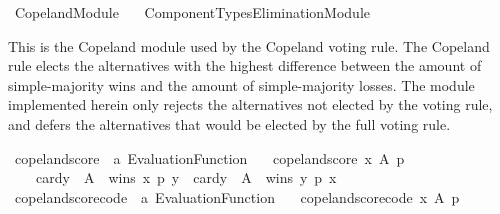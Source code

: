 %
\begin{isabellebody}%
%
%
\isadelimdocument
\isanewline
%
\endisadelimdocument
%
\isatagdocument
\isanewline
%
\isamarkuptrue%
%
\endisatagdocument
{\isafolddocument}%
%
\isadelimdocument
%
\endisadelimdocument
%
\isadelimtheory
%
\endisadelimtheory
%
\isatagtheory
{}\isamarkupfalse%
\ Copeland{\isacharunderscore}{\kern0pt}Module\isanewline
\ \ \ {\isachardoublequoteopen}Component{\isacharunderscore}{\kern0pt}Types{\isacharslash}{\kern0pt}Elimination{\isacharunderscore}{\kern0pt}Module{\isachardoublequoteclose}\isanewline
{}%
\endisatagtheory
{\isafoldtheory}%
%
\isadelimtheory
%
\endisadelimtheory
%
\begin{isamarkuptext}%
This is the Copeland module used by the Copeland voting rule. The Copeland
rule elects the alternatives with the highest difference between the amount
of simple-majority wins and the amount of simple-majority losses. The module
implemented herein only rejects the alternatives not elected by the voting
rule, and defers the alternatives that would be elected by the full voting
rule.%
\end{isamarkuptext}\isamarkuptrue%
%
\isadelimdocument
%
\endisadelimdocument
%
\isatagdocument
%
\isamarkuptrue%
%
\endisatagdocument
{\isafolddocument}%
%
\isadelimdocument
%
\endisadelimdocument
{}\isamarkupfalse%
\ copeland{\isacharunderscore}{\kern0pt}score\ {\isacharcolon}{\kern0pt}{\isacharcolon}{\kern0pt}\ {\isachardoublequoteopen}{\isacharprime}{\kern0pt}a\ Evaluation{\isacharunderscore}{\kern0pt}Function{\isachardoublequoteclose}\ \isanewline
\ \ {\isachardoublequoteopen}copeland{\isacharunderscore}{\kern0pt}score\ x\ A\ p\ {\isacharequal}{\kern0pt}\isanewline
\ \ \ \ card{\isacharbraceleft}{\kern0pt}y\ {\isasymin}\ A\ {\isachardot}{\kern0pt}\ wins\ x\ p\ y{\isacharbraceright}{\kern0pt}\ {\isacharminus}{\kern0pt}\ card{\isacharbraceleft}{\kern0pt}y\ {\isasymin}\ A\ {\isachardot}{\kern0pt}\ wins\ y\ p\ x{\isacharbraceright}{\kern0pt}{\isachardoublequoteclose}\isanewline
\isanewline
{}\isamarkupfalse%
\ copeland{\isacharunderscore}{\kern0pt}score{\isacharunderscore}{\kern0pt}code\ {\isacharcolon}{\kern0pt}{\isacharcolon}{\kern0pt}\ {\isachardoublequoteopen}{\isacharprime}{\kern0pt}a\ Evaluation{\isacharunderscore}{\kern0pt}Function{\isachardoublequoteclose}\ \isanewline
\ \ {\isachardoublequoteopen}copeland{\isacharunderscore}{\kern0pt}score{\isacharunderscore}{\kern0pt}code\ x\ A\ p\ {\isacharequal}{\kern0pt}\isanewline

\end{isabellebody}
